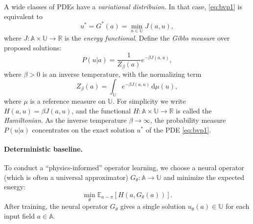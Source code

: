 \documentclass[11pt]{article}
\newcommand{\bbR}{\mathbb{R}}
\newcommand{\bbE}{\mathbb{E}}
\renewcommand{\d}{\mathrm{d}}
\begin{document}
A wide classes of PDEs have a \textit{variational distribuion}. In that case, \eqref{eq:bvp1} is equivalent to 
\begin{equation*}
    u^*=G^*(a)=\min_{u\in\mathbb{U}} J(a,u),
\end{equation*}
where $J:\mathbb{A}\times\mathbb{U}\to\bbR$ is the \textit{energy functional}. Define the \textit{Gibbs measure} over proposed solutions:
\begin{equation*}
    P(u|a)=\frac{1}{Z_\beta(a)}e^{-\beta J(a,u)},
\end{equation*}
where $\beta>0$ is an inverse temperature, with the normalizing term 
\begin{equation}
    Z_\beta(a)=\int_{\mathbb{U}} e^{-\beta J(a,u)}\,\d\mu(u),
\end{equation}
where $\mu$ is a reference measure on $\mathbb{U}$. For simplicity we write $H(a,u)=\beta J(a,u)$, and the functional
$H:\mathbb{A}\times\mathbb{U}\to\bbR$ is called the \textit{Hamiltonian}. As the inverse temperature $\beta\to\infty$, the probability measure $P(u|a)$ concentrates on the exact solution $u^*$ of the PDE \eqref{eq:bvp1}.

\paragraph{Deterministic baseline.} To conduct a ``physics-informed'' operator learning, we choose a neural operator (which is often a universal approximator) $G_\theta:\mathbb{A}\to\mathbb{U}$ and minimize the expected energy:  
\begin{equation*}
    \min_\theta \bbE_{a\sim\pi} \left[H(a,G_\theta(a))\right].
\end{equation*}
After training, the neural operator $G_\theta$ gives a single solution $u_\theta(a)\in\mathbb{U}$ for each input field $a\in\mathbb{A}$.
\end{document}
